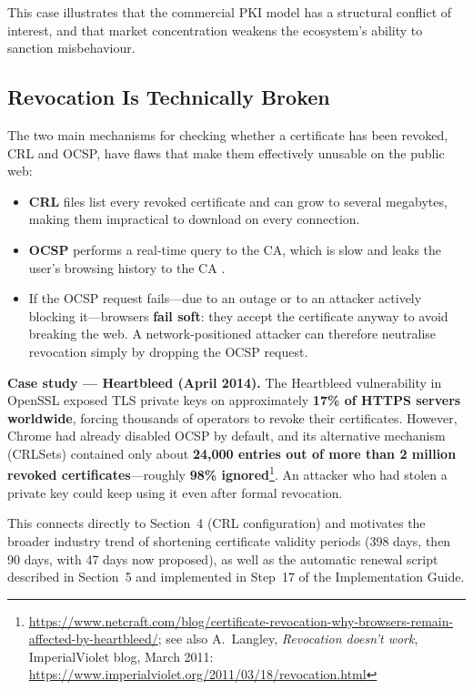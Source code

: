 \documentclass[10pt,twocolumn]{article}
\newcommand{\IGbase}{https://github.com/willLeckyThom/NetworkSecurity/blob/main/Projet/certificate_chain.md}
\newif\ifIGhref
\newcommand{\IGstep}[2]{\ifIGhref\href{\IGbase\##1}{#2}\else#2\fi}%
\begin{document}
This case illustrates that the commercial PKI model has a structural
conflict of interest, and that market concentration weakens the ecosystem's
ability to sanction misbehaviour.

\subsection{Revocation Is Technically Broken}

The two main mechanisms for checking whether a certificate has been revoked,
CRL and OCSP, have flaws that make them effectively unusable on the public
web:

\begin{itemize}
  \item \textbf{CRL} files list every revoked certificate and can grow to
        several megabytes, making them impractical to download on every
        connection.
  \item \textbf{OCSP} performs a real-time query to the CA, which is slow
        and leaks the user's browsing history to the CA \cite{rfc6960}.
  \item If the OCSP request fails---due to an outage or to an attacker
        actively blocking it---browsers \textbf{fail soft}: they accept the
        certificate anyway to avoid breaking the web. A network-positioned
        attacker can therefore neutralise revocation simply by dropping the
        OCSP request.
\end{itemize}

\textbf{Case study --- Heartbleed (April 2014).} The Heartbleed vulnerability
in OpenSSL exposed TLS private keys on approximately \textbf{17\% of HTTPS
servers worldwide}, forcing thousands of operators to revoke their
certificates. However, Chrome had already disabled OCSP by default, and its
alternative mechanism (CRLSets) contained only about \textbf{24{,}000
entries out of more than 2 million revoked certificates}---roughly
\textbf{98\% ignored}\footnote{\url{https://www.netcraft.com/blog/certificate-revocation-why-browsers-remain-affected-by-heartbleed/}; see also A.~Langley, \textit{Revocation doesn't work}, ImperialViolet blog, March 2011: \url{https://www.imperialviolet.org/2011/03/18/revocation.html}}. An
attacker who had stolen a private key could keep using it even after formal
revocation.

This connects directly to Section~4 (CRL configuration) and motivates the
broader industry trend of shortening certificate validity periods (398 days,
then 90 days, with 47 days now proposed), as well as the automatic renewal
script described in Section~5 and implemented in
\IGstep{step-17-create-the-renewal-script}{Step~17 of the Implementation
Guide}.
\end{document}
